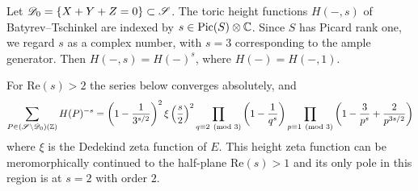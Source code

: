 \begin{theorem}

\label{thm:heightZetaFunctionFormula}


\leanok

Let $\mathscr{D}_0=\{X+Y+Z=0\}\subset\mathscr{S}$. The toric height functions $H(-,s)$ of Batyrev--Tschinkel \cite{MR1369408} are indexed by $s\in\mathrm{Pic}(S)\otimes\mathbb{C}$. Since $S$ has Picard rank one, we regard $s$ as a complex number, with $s=3$ corresponding to the ample generator. Then $H(-,s)=H(-)^s$, where $H(-)=H(-,1)$.

 For $\mathrm{Re}(s)>2$ the series below converges absolutely, and \begin{equation*} \sum_{P \in (\mathscr{S}\setminus\mathscr{D}_0)(\mathbb{Z})} H(P)^{-s} = \left(1-\frac{1}{3^{s/2}}\right)^2 \xi\left(\frac s2\right)^2 \prod_{q\equiv2\pmod{3}}\left(1-\frac{1}{q^{s}}\right) \prod_{p\equiv1\pmod{3}}\left(1-\frac{3}{p^{s}}+\frac{2}{p^{3s/2}}\right) \end{equation*} where $\xi$ is the Dedekind zeta function of $E$. This height zeta function can be meromorphically continued to the half-plane $\mathrm{Re}(s)>1$ and its only pole in this region is at $s = 2$ with order $2$. 

\end{theorem}

